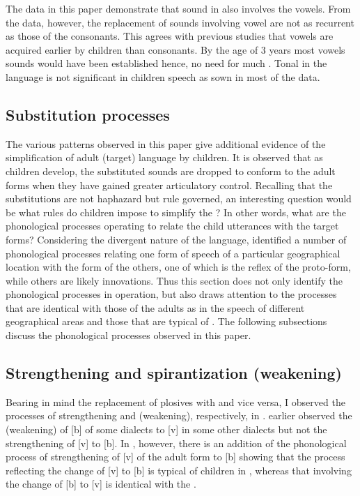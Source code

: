 \documentclass[output=paper,
modfonts
]{langscibook}
\begin{document}
The data in this paper demonstrate that sound  in  also involves the vowels. From the data, however, the replacement of sounds involving vowel are not as recurrent as those of the consonants. This agrees with previous studies that vowels are acquired earlier by children than consonants. By the age of 3 years most vowels sounds would have been established hence, no need for much . Tonal  in the language is not significant in children speech as sown in most of the data. 

\subsection{Substitution processes}\label{sec:alerechi:1.8}

The various  patterns observed in this paper give additional evidence of the simplification of adult (target) language by children. It is observed that as children develop, the substituted sounds are dropped to conform to the adult forms when they have gained greater articulatory control. Recalling that the substitutions are not haphazard but rule governed, an interesting question would be what rules do children impose to simplify the ? In other words, what are the phonological processes operating to relate the child utterances with the target forms? Considering the divergent nature of the  language, \citet{Alerechi2007a} identified a number of phonological processes relating one form of speech of a particular geographical location with the form of the others, one of which is the reflex of the proto-form, while others are likely innovations. Thus this section does not only identify the phonological processes in operation, but also draws attention to the processes that are identical with those of the adults as in the speech of different geographical areas and those that are typical of . The following subsections discuss the phonological processes observed in this paper.

\subsection{Strengthening and spirantization (weakening)}\label{sec:alerechi:1.9}

Bearing in mind the replacement of plosives with  and vice versa, I observed the processes of strengthening and  (weakening), respectively, in . \citet[262]{Alerechi2007a} earlier observed the  (weakening) of [b] of some dialects to [v] in some other dialects but not the strengthening of [v] to [b]. In , however, there is an addition of the phonological process of strengthening of [v] of the adult form to [b] showing that the process reflecting the change of [v] to [b] is typical of children in , whereas that involving the change of [b] to [v] is identical with the . 
\end{document}
